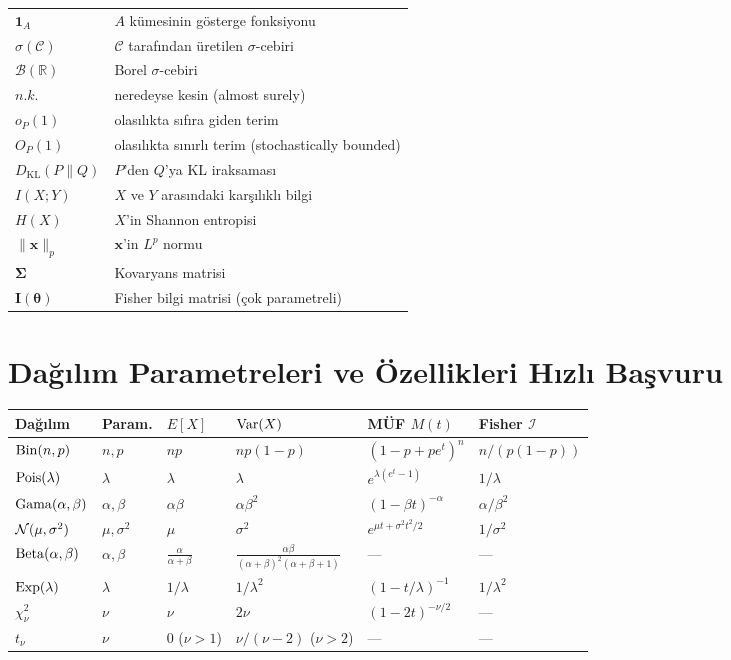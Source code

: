 \begin{center}
\begin{tabular}{p{4cm}p{9cm}}
$\mathbf{1}_A$ & $A$ kümesinin gösterge fonksiyonu \\
$\sigma(\mathcal{C})$ & $\mathcal{C}$ tarafından üretilen $\sigma$-cebiri \\
$\mathcal{B}(\mathbb{R})$ & Borel $\sigma$-cebiri \\
$n.k.$ & neredeyse kesin (almost surely) \\
$o_P(1)$ & olasılıkta sıfıra giden terim \\
$O_P(1)$ & olasılıkta sınırlı terim (stochastically bounded) \\
$D_\mathrm{KL}(P\|Q)$ & $P$'den $Q$'ya KL iraksaması \\
$I(X;Y)$ & $X$ ve $Y$ arasındaki karşılıklı bilgi \\
$H(X)$ & $X$'in Shannon entropisi \\
$\|\mathbf{x}\|_p$ & $\mathbf{x}$'in $L^p$ normu \\
$\boldsymbol\Sigma$ & Kovaryans matrisi \\
$\mathbf{I}(\boldsymbol\theta)$ & Fisher bilgi matrisi (çok parametreli) \\
\hline
\end{tabular}
\end{center}

\section{Dağılım Parametreleri ve Özellikleri Hızlı Başvuru}
\label{app:dagılım_hizli}

\begin{center}
\renewcommand{\arraystretch}{1.3}
\begin{tabular}{llllll}
\hline
\textbf{Dağılım} & \textbf{Param.} & $E[X]$ & $\operatorname{Var}(X)$ & \textbf{MÜF} $M(t)$ & \textbf{Fisher} $\mathcal{I}$ \\
\hline
$\operatorname{Bin}(n,p)$ & $n,p$ & $np$ & $np(1-p)$ & $(1-p+pe^t)^n$ & $n/(p(1-p))$ \\
$\operatorname{Pois}(\lambda)$ & $\lambda$ & $\lambda$ & $\lambda$ & $e^{\lambda(e^t-1)}$ & $1/\lambda$ \\
$\operatorname{Gama}(\alpha,\beta)$ & $\alpha,\beta$ & $\alpha\beta$ & $\alpha\beta^2$ & $(1-\beta t)^{-\alpha}$ & $\alpha/\beta^2$ \\
$\mathcal{N}(\mu,\sigma^2)$ & $\mu,\sigma^2$ & $\mu$ & $\sigma^2$ & $e^{\mu t+\sigma^2t^2/2}$ & $1/\sigma^2$ \\
$\operatorname{Beta}(\alpha,\beta)$ & $\alpha,\beta$ & $\frac{\alpha}{\alpha+\beta}$ & $\frac{\alpha\beta}{(\alpha+\beta)^2(\alpha+\beta+1)}$ & — & — \\
$\operatorname{Exp}(\lambda)$ & $\lambda$ & $1/\lambda$ & $1/\lambda^2$ & $(1-t/\lambda)^{-1}$ & $1/\lambda^2$ \\
$\chi^2_\nu$ & $\nu$ & $\nu$ & $2\nu$ & $(1-2t)^{-\nu/2}$ & — \\
$t_\nu$ & $\nu$ & $0$ ($\nu>1$) & $\nu/(\nu-2)$ ($\nu>2$) & — & — \\
\hline
\end{tabular}
\end{center}

